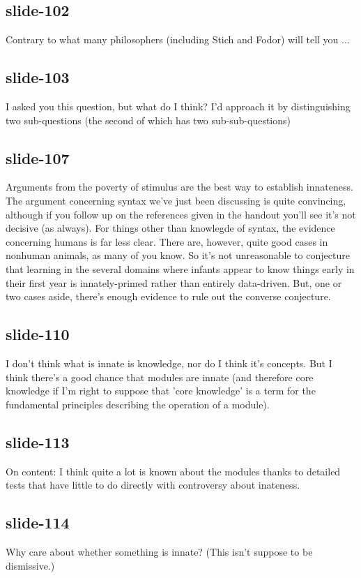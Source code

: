 \documentclass[12pt,\papersize]{extarticle}
\begin{document}
 
\subsection{slide-102}
Contrary to what many philosophers (including Stich and Fodor) will tell you ...
 
 
\subsection{slide-103}
I asked you this question, but what do I think?
I'd approach it by distinguishing two sub-questions (the second of which has two sub-sub-questions)
 
 
\subsection{slide-107}
Arguments from the poverty of stimulus are the best way to establish innateness.
The argument concerning syntax we've just been discussing is quite convincing, although if you follow up on the references given in the handout you'll see it's not decisive (as always).
For things other than knowlegde of syntax, the evidence concerning humans is far less clear.
There are, however, quite good cases in nonhuman animals, as many of you know.
So it's not unreasonable to conjecture that learning in the several domains where infants appear to know things early in their first year is innately-primed rather than entirely data-driven.
But, one or two cases aside, there's enough evidence to rule out the converse conjecture.
 
 
\subsection{slide-110}
I don't think what is innate is knowledge, nor do I think it's concepts.
But I think there's a good chance that modules are innate (and therefore core knowledge if I'm right to suppose that 'core knowledge' is a term for the fundamental principles describing the operation of a module).
 
 
\subsection{slide-113}
On content: I think quite a lot is known about the modules thanks to detailed tests that have little to do directly with controversy about inateness.
 
 
\subsection{slide-114}
Why care about whether something is innate? (This isn't suppose to be dismissive.)
 
\end{document}
